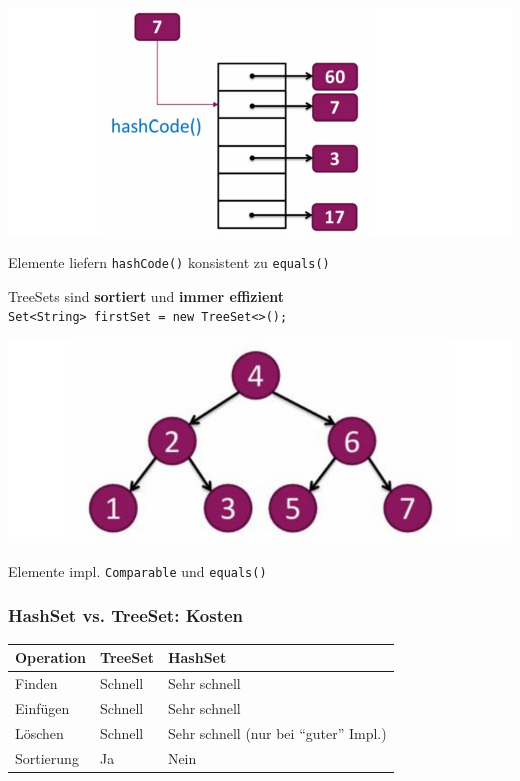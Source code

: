{    \begin{minipage}{0.5\columnwidth}
        \includegraphics[width=0.9\linewidth]{pictures/hashset.jpg}
    \end{minipage}
    \hfill
    \begin{minipage}{0.45\columnwidth}
        Elemente liefern \verb|hashCode()| konsistent zu \verb|equals()|
    \end{minipage}

    TreeSets sind \textbf{sortiert} und \textbf{immer effizient}\\
    \verb|Set<String> firstSet = new TreeSet<>();|

    \begin{minipage}{0.5\columnwidth}
        \includegraphics[width=0.9\linewidth-1cm]{pictures/treeset.jpg}
    \end{minipage}
    \hfill
    \begin{minipage}{0.45\columnwidth}
        Elemente impl. \verb|Comparable| und \verb|equals()|
    \end{minipage}
    \vspace{-0.1cm}

    \subsubsection{HashSet vs. TreeSet: Kosten}
        \begin{tabular}{l l l} \hline
            \textbf{Operation} & \textbf{TreeSet} & \textbf{HashSet }\\ \hline
            Finden      & \color{yellow!75!red} Schnell    & \color{green!80!black}Sehr schnell \\
            Einfügen    & \color{yellow!75!red} Schnell    & \color{green!80!black}Sehr schnell \\
            Löschen     & \color{yellow!75!red} Schnell    & \color{green!80!black}Sehr schnell (nur bei ``guter'' Impl.) \\
            Sortierung  & \color{green!80!black} Ja        & \color{red}Nein \\
        \end{tabular}
        \vspace{-0.1cm}

}
